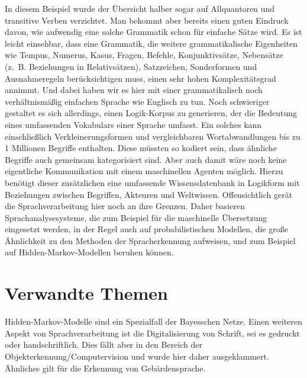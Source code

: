 In diesem Beispiel wurde der Übersicht halber sogar auf Allquantoren und transitive Verben verzichtet.
Man bekommt aber bereits einen guten Eindruck davon, wie aufwendig eine solche Grammatik schon für einfache Sätze wird.
Es ist leicht einsehbar, dass eine Grammatik, die weitere grammatikalische Eigenheiten wie Tempus, Numerus, Kasus, Fragen, Befehle, Konjunktivsätze, Nebensätze (z.~B.
Beziehungen in Relativsätzen), Satzzeichen, Sonderformen und Ausnahmeregeln berücksichtigen muss, einen sehr hohen Komplexitätsgrad annimmt.
Und dabei haben wir es hier mit einer grammatikalisch noch verhältnismäßig einfachen Sprache wie Englisch zu tun.
Noch schwieriger gestaltet es sich allerdings, einen Logik-Korpus zu generieren, der die Bedeutung eines umfassenden Vokabulars einer Sprache umfasst.
Ein solches kann einschließlich Verkleinerungsformen und vergleichbaren Wortabwandlungen bis zu 1 Millionen Begriffe enthalten.
Diese müssten so kodiert sein, dass ähnliche Begriffe auch gemeinsam kategorisiert sind.
Aber auch damit wäre noch keine eigentliche Kommunikation mit einem maschinellen Agenten möglich.
Hierzu benötigt dieser zusätzlichen eine umfassende Wissensdatenbank in Logikform mit Beziehungen zwischen Begriffen, Akteuren und Weltwissen.
Offensichtlich gerät die Sprachverarbeitung hier noch an ihre Grenzen.
Daher basieren Sprachanalysesysteme, die zum Beispiel für die maschinelle Übersetzung eingesetzt werden, in der Regel auch auf probabilistischen Modellen, die große Ähnlichkeit zu den Methoden der Spracherkennung aufweisen, und zum Beispiel auf Hidden-Markov-Modellen beruhen können.

\section{Verwandte Themen}
Hidden-Markov-Modelle sind ein Spezialfall der Bayesschen Netze.
Einen weiteren Aspekt von Sprachverarbeitung ist die Digitalisierung von Schrift, sei es gedruckt oder handschriftlich.
Dies fällt aber in den Bereich der Objekterkennung/Computervision und wurde hier daher ausgeklammert.
Ähnliches gilt für die Erkennung von Gebärdensprache.

